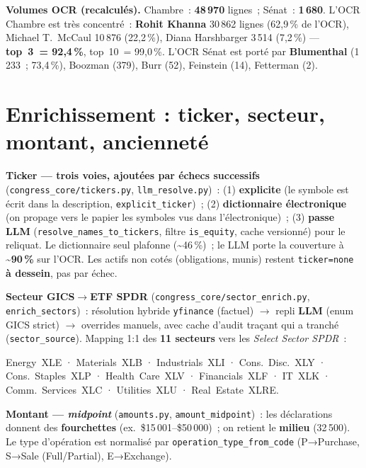 \documentclass[11pt,a4paper]{article}
\newcommand{\co}[1]{\texttt{\small #1}}
\begin{document}
\textbf{Volumes OCR (recalculés).} Chambre~: \textbf{48\,970} lignes~; Sénat~: \textbf{1\,680}.
L'OCR Chambre est très concentré~: \textbf{Rohit Khanna} 30\,862 lignes (62,9\,\% de l'OCR), Michael
T.~McCaul 10\,876 (22,2\,\%), Diana Harshbarger 3\,514 (7,2\,\%) — \textbf{top~3~= 92,4\,\%},
top~10~= 99,0\,\%. L'OCR Sénat est porté par \textbf{Blumenthal} (1\,233~; 73,4\,\%), Boozman (379),
Burr (52), Feinstein (14), Fetterman (2).

\section{Enrichissement : ticker, secteur, montant, ancienneté}
\label{sec:enrich}

\textbf{Ticker — trois voies, ajoutées par échecs successifs} (\co{congress_core/tickers.py},
\co{llm_resolve.py})~: (1) \textbf{explicite} (le symbole est écrit dans la description,
\co{explicit_ticker})~; (2) \textbf{dictionnaire électronique} (on propage vers le papier les symboles
vus dans l'électronique)~; (3) \textbf{passe LLM} (\co{resolve_names_to_tickers}, filtre \co{is_equity},
cache versionné) pour le reliquat. Le dictionnaire seul plafonne (\textasciitilde 46\,\%)~; le LLM
porte la couverture à \textbf{\textasciitilde 90\,\%} sur l'OCR. Les actifs non cotés (obligations,
munis) restent \co{ticker=none} \textbf{à dessein}, pas par échec.

\textbf{Secteur GICS$\rightarrow$ETF SPDR} (\co{congress_core/sector_enrich.py}, \co{enrich_sectors})~:
résolution hybride \co{yfinance} (factuel) $\rightarrow$ repli \textbf{LLM} (enum GICS strict)
$\rightarrow$ overrides manuels, avec cache d'audit traçant qui a tranché (\co{sector_source}). Mapping
1:1 des \textbf{11 secteurs} vers les \emph{Select Sector SPDR}~:
\begin{center}\scriptsize
Energy~XLE · Materials~XLB · Industrials~XLI · Cons.~Disc.~XLY · Cons.~Staples~XLP · Health~Care~XLV ·
Financials~XLF · IT~XLK · Comm.~Services~XLC · Utilities~XLU · Real~Estate~XLRE.
\end{center}

\textbf{Montant — \emph{midpoint}} (\co{amounts.py}, \co{amount_midpoint})~: les déclarations donnent
des \textbf{fourchettes} (ex.~\$15\,001--\$50\,000)~; on retient le \textbf{milieu} (32\,500). Le type
d'opération est normalisé par \co{operation_type_from_code} (P→Purchase, S→Sale (Full/Partial),
E→Exchange).
\end{document}
